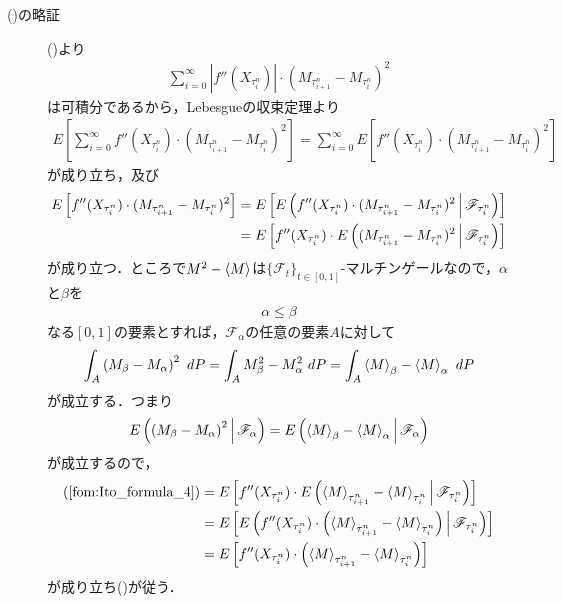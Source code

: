 \begin{sketch}
\begin{description}
			\item[()の略証]
				()より
				\begin{align}
					\sum_{i=0}^{\infty} \left|f''(X_{\tau^{n}_{i}})\right| \cdot (M_{\tau^{n}_{i+1}} - M_{\tau^{n}_{i}})^{2}
				\end{align}
				は可積分であるから，Lebesgueの収束定理より
				\begin{align}
					E\left[\sum_{i=0}^{\infty} f''(X_{\tau^{n}_{i}}) \cdot (M_{\tau^{n}_{i+1}} - M_{\tau^{n}_{i}})^{2}\right]
					= \sum_{i=0}^{\infty} E\left[f''(X_{\tau^{n}_{i}}) \cdot (M_{\tau^{n}_{i+1}} - M_{\tau^{n}_{i}})^{2}\right]
				\end{align}
				が成り立ち，及び
				\begin{align}
					E\left[f''(X_{\tau^{n}_{i}}) \cdot (M_{\tau^{n}_{i+1}} - M_{\tau^{n}_{i}})^{2}\right]
					&= E\left[E\left( f''(X_{\tau^{n}_{i}}) \cdot (M_{\tau^{n}_{i+1}} - M_{\tau^{n}_{i}})^{2} \, \middle|\, \mathscr{F}_{\tau^{n}_{i}} \right)\right] \\
					&= E\left[f''(X_{\tau^{n}_{i}}) \cdot E\left( (M_{\tau^{n}_{i+1}} - M_{\tau^{n}_{i}})^{2} \, \middle|\, \mathscr{F}_{\tau^{n}_{i}} \right)\right]
					\label{fom:Ito_formula_4}
				\end{align}
				が成り立つ．ところで$M^{2} - \inprod<M>$は$\{\mathscr{F}_{t}\}_{t \in [0,1]}$-マルチンゲールなので，$\alpha$と$\beta$を
				\begin{align}
					\alpha \leq \beta
				\end{align}
				なる$[0,1]$の要素とすれば，$\mathscr{F}_{\alpha}$の任意の要素$A$に対して
				\begin{align}
					\int_{A} \left(M_{\beta} - M_{\alpha}\right)^{2}\ dP
					= \int_{A} M_{\beta}^{2} - M_{\alpha}^{2}\ dP
					= \int_{A} \inprod<M>_{\beta} - \inprod<M>_{\alpha}\ dP
				\end{align}
				が成立する．つまり
				\begin{align}
					\cexp{\left(M_{\beta} - M_{\alpha}\right)^{2}}{\mathscr{F}_{\alpha}}
					= \cexp{\inprod<M>_{\beta} - \inprod<M>_{\alpha}}{\mathscr{F}_{\alpha}}
				\end{align}
				が成立するので，
				\begin{align}
					(\refeq{fom:Ito_formula_4})
					&= E\left[f''(X_{\tau^{n}_{i}}) \cdot \cexp{\inprod<M>_{\tau^{n}_{i+1}} - \inprod<M>_{\tau^{n}_{i}}}{\mathscr{F}_{\tau^{n}_{i}}}\right] \\
					&= E\left[\cexp{f''(X_{\tau^{n}_{i}}) \cdot \left(\inprod<M>_{\tau^{n}_{i+1}} - \inprod<M>_{\tau^{n}_{i}}\right)}{\mathscr{F}_{\tau^{n}_{i}}}\right] \\
					&= E\left[f''(X_{\tau^{n}_{i}}) \cdot \left(\inprod<M>_{\tau^{n}_{i+1}} - \inprod<M>_{\tau^{n}_{i}}\right)\right]
				\end{align}
				が成り立ち()が従う．
		\end{description}
	\end{sketch}
	
